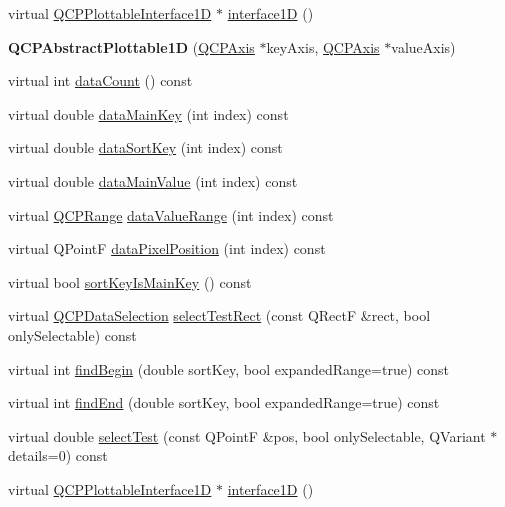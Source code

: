 \begin{DoxyCompactItemize}
\item 
virtual \hyperlink{class_q_c_p_plottable_interface1_d}{Q\+C\+P\+Plottable\+Interface1D} $\ast$ \hyperlink{class_q_c_p_abstract_plottable1_d_a3ab7511c279af967955369606c584dd6}{interface1D} ()
\item 
\mbox{\label{class_q_c_p_abstract_plottable1_d_a30b2e50ab0afce65f104ea7a95440315}} 
{\bfseries Q\+C\+P\+Abstract\+Plottable1D} (\hyperlink{class_q_c_p_axis}{Q\+C\+P\+Axis} $\ast$key\+Axis, \hyperlink{class_q_c_p_axis}{Q\+C\+P\+Axis} $\ast$value\+Axis)
\item 
virtual int \hyperlink{class_q_c_p_abstract_plottable1_d_a75713bbfc9d4b6cacab51d76e870b497}{data\+Count} () const
\item 
virtual double \hyperlink{class_q_c_p_abstract_plottable1_d_aa996a79be21741bdea8284f0bb776ed1}{data\+Main\+Key} (int index) const
\item 
virtual double \hyperlink{class_q_c_p_abstract_plottable1_d_aa044a82f3400b52f49e247d30ffb162d}{data\+Sort\+Key} (int index) const
\item 
virtual double \hyperlink{class_q_c_p_abstract_plottable1_d_a104b2e36cf4d4ea29f7247887a193842}{data\+Main\+Value} (int index) const
\item 
virtual \hyperlink{class_q_c_p_range}{Q\+C\+P\+Range} \hyperlink{class_q_c_p_abstract_plottable1_d_a3070f8b8ce4729ea60837aac603aa0f9}{data\+Value\+Range} (int index) const
\item 
virtual Q\+PointF \hyperlink{class_q_c_p_abstract_plottable1_d_abc363be6268d4547aa5324cb88138f30}{data\+Pixel\+Position} (int index) const
\item 
virtual bool \hyperlink{class_q_c_p_abstract_plottable1_d_aa4a61e7fc79f1b71ff660db53c92efd2}{sort\+Key\+Is\+Main\+Key} () const
\item 
virtual \hyperlink{class_q_c_p_data_selection}{Q\+C\+P\+Data\+Selection} \hyperlink{class_q_c_p_abstract_plottable1_d_a51624b702b6f9e50d83e759986c2b39a}{select\+Test\+Rect} (const Q\+RectF \&rect, bool only\+Selectable) const
\item 
virtual int \hyperlink{class_q_c_p_abstract_plottable1_d_ae8206cf770f180e01d0a02e998d4e788}{find\+Begin} (double sort\+Key, bool expanded\+Range=true) const
\item 
virtual int \hyperlink{class_q_c_p_abstract_plottable1_d_a02434e0e5599cd072225692f3469750b}{find\+End} (double sort\+Key, bool expanded\+Range=true) const
\item 
virtual double \hyperlink{class_q_c_p_abstract_plottable1_d_ab69f71c97019e44699599e654d382a98}{select\+Test} (const Q\+PointF \&pos, bool only\+Selectable, Q\+Variant $\ast$details=0) const
\item 
virtual \hyperlink{class_q_c_p_plottable_interface1_d}{Q\+C\+P\+Plottable\+Interface1D} $\ast$ \hyperlink{class_q_c_p_abstract_plottable1_d_ab5f14406cf661087a8ed87baea37bc7e}{interface1D} ()
\end{DoxyCompactItemize}
